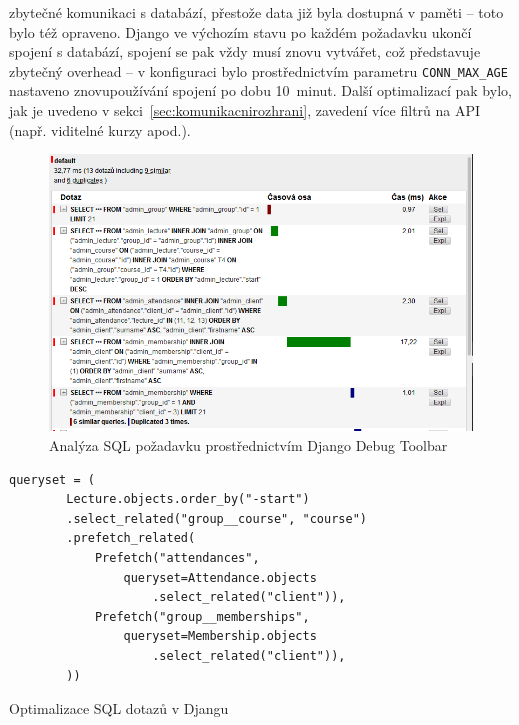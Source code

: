 zbytečné komunikaci s databází, přestože data již byla dostupná v paměti -- toto bylo též opraveno. Django ve výchozím stavu po každém požadavku ukončí spojení s databází, spojení se pak vždy musí znovu vytvářet, což představuje zbytečný overhead \cite{django-db} -- v konfiguraci bylo prostřednictvím parametru \verb|CONN_MAX_AGE| nastaveno znovupoužívání spojení po dobu 10~minut. Další optimalizací pak bylo, jak je uvedeno v sekci~\ref{sec:komunikacnirozhrani}, zavedení více filtrů na API (např. viditelné kurzy apod.).

\begin{figure}[h]\centering
    \includegraphics[width=1\textwidth]{img/ddt.png}
    \caption{Analýza SQL požadavku prostřednictvím Django Debug Toolbar}\label{fig:ddt}
\end{figure}

\begin{listing}[ht]
	\begin{verbatim}
queryset = (
        Lecture.objects.order_by("-start")
        .select_related("group__course", "course")
        .prefetch_related(
            Prefetch("attendances",
                queryset=Attendance.objects
                    .select_related("client")),
            Prefetch("group__memberships",
                queryset=Membership.objects
                    .select_related("client")),
        ))
	\end{verbatim}
	\caption{Optimalizace SQL dotazů v Djangu}\label{lst:optimalizace-django}
\end{listing}

